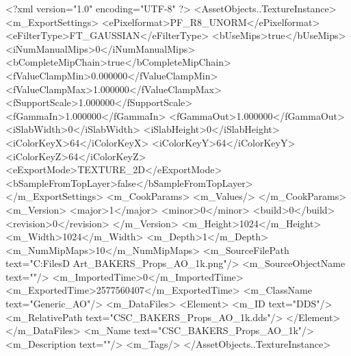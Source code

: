 <?xml version="1.0" encoding="UTF-8" ?>
<AssetObjects..TextureInstance>
	<m_ExportSettings>
		<ePixelformat>PF_R8_UNORM</ePixelformat>
		<eFilterType>FT_GAUSSIAN</eFilterType>
		<bUseMips>true</bUseMips>
		<iNumManualMips>0</iNumManualMips>
		<bCompleteMipChain>true</bCompleteMipChain>
		<fValueClampMin>0.000000</fValueClampMin>
		<fValueClampMax>1.000000</fValueClampMax>
		<fSupportScale>1.000000</fSupportScale>
		<fGammaIn>1.000000</fGammaIn>
		<fGammaOut>1.000000</fGammaOut>
		<iSlabWidth>0</iSlabWidth>
		<iSlabHeight>0</iSlabHeight>
		<iColorKeyX>64</iColorKeyX>
		<iColorKeyY>64</iColorKeyY>
		<iColorKeyZ>64</iColorKeyZ>
		<eExportMode>TEXTURE_2D</eExportMode>
		<bSampleFromTopLayer>false</bSampleFromTopLayer>
	</m_ExportSettings>
	<m_CookParams>
		<m_Values/>
	</m_CookParams>
	<m_Version>
		<major>1</major>
		<minor>0</minor>
		<build>0</build>
		<revision>0</revision>
	</m_Version>
	<m_Height>1024</m_Height>
	<m_Width>1024</m_Width>
	<m_Depth>1</m_Depth>
	<m_NumMipMaps>10</m_NumMipMaps>
	<m_SourceFilePath text="C:\Users\Shadow\Desktop\Working Files\3D Art\Textures\CSC_BAKERS_Props_AO_1k.png"/>
	<m_SourceObjectName text=""/>
	<m_ImportedTime>0</m_ImportedTime>
	<m_ExportedTime>2577560407</m_ExportedTime>
	<m_ClassName text="Generic_AO"/>
	<m_DataFiles>
		<Element>
			<m_ID text="DDS"/>
			<m_RelativePath text="CSC_BAKERS_Props_AO_1k.dds"/>
		</Element>
	</m_DataFiles>
	<m_Name text="CSC_BAKERS_Props_AO_1k"/>
	<m_Description text=""/>
	<m_Tags/>
</AssetObjects..TextureInstance>

